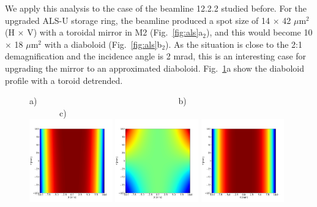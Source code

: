 \documentclass{iucr}              %
\begin{document}
We apply this analysis to the case of the beamline 12.2.2 studied before. For the upgraded ALS-U storage ring, the beamline produced a spot size of 14 $\times$ 42 $\mu$m$^2$ (H $\times$ V) with a toroidal mirror in M2 (Fig.~\ref{fig:als}a$_2$), and this would become 10 $\times$ 18 $\mu$m$^2$ with a diaboloid (Fig.~\ref{fig:als}b$_2$). As the situation is close to the 2:1 demagnification and the incidence angle is 2 mrad, this is an interesting case for upgrading the mirror to an approximated diaboloid. Fig.~\ref{fig:detrendedBeamline}a show the diaboloid profile with a toroid detrended. 


\begin{figure}\label{fig:detrendedBeamline}
\flushleft
a)~~~~~~~~~~~~~~~~~~~~~~~~~~~~~~~~~b)~~~~~~~~~~~~~~~~~~~~~~~~~~~~~~c)\\
\centering
\includegraphics[width=0.32\textwidth]{figures/diaboloid_bl1222_detrended_image.png} 
\includegraphics[width=0.32\textwidth]{figures/linearizedparaboliccone_bl1222_detrended_image.png} 
\includegraphics[width=0.32\textwidth]{figures/ellipticalcylinder_bl1222_detrended_image.png} 


\end{figure}
\end{document}
